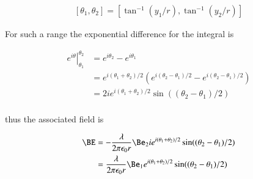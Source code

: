 \begin{align*}
[\theta_1, \theta_2] = [\tan^{-1}(y_1/r), \tan^{-1}(y_2/r)]
\end{align*}

For such a range the exponential difference for the integral is

\begin{align*}
\left. e^{i\theta} \right \vert_{\theta_1}^{\theta_2} 
&= e^{i\theta_2} - e^{i\theta_1} \\
&= e^{i(\theta_1 + \theta_2)/2} \left( e^{i(\theta_2 - \theta_1)/2} -e^{i(\theta_2 - \theta_1)/2} \right) \\
&= 2 i e^{i(\theta_1 + \theta_2)/2} \sin((\theta_2 - \theta_1)/2) \\
\end{align*}

thus the associated field is

\begin{align*}
\BE 
&= -\frac{\lambda} {2 \pi \epsilon_0 r} \Be_2 i e^{i(\theta_1 + \theta_2)/2} \sin((\theta_2 - \theta_1)/2) \\
&= \frac{\lambda} {2 \pi \epsilon_0 r} \Be_1 e^{i(\theta_1 + \theta_2)/2} \sin((\theta_2 - \theta_1)/2) \\
\end{align*}
